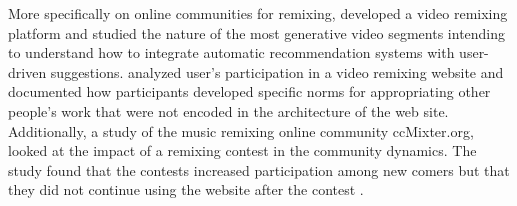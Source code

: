 More specifically on online communities for remixing, \citet{shaw_community_2006} developed a video remixing platform and studied the nature of the most generative video segments intending to understand how to integrate automatic recommendation systems with user-driven suggestions.
\citet{diakopoulos_evolution_2007} analyzed user's participation in a video remixing website and documented how participants developed specific norms for appropriating other people's work that were not encoded in the architecture of the web site.
Additionally, a study of the music remixing online community ccMixter.org, looked at the impact of a remixing contest in the community dynamics.
The study found that the contests increased participation among new comers but that they did not continue using the website after the contest \citep{cheliotis_analysis_2009}. 

